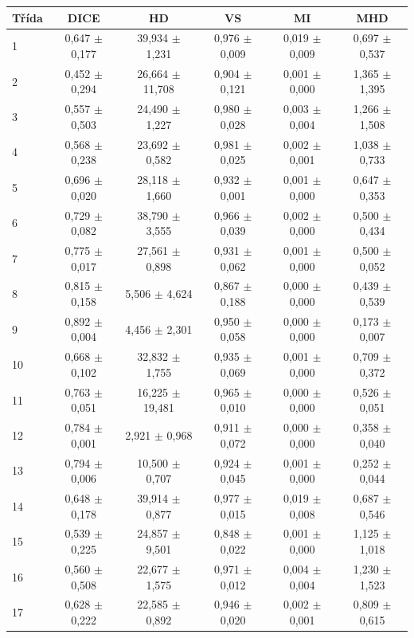 \begin{tabular}{l c c c c c}
 \hline
Třída & DICE & HD & VS & MI & MHD \\ \hline
1 & 0,647 $\pm$ 0,177 & 39,934 $\pm$ 1,231 & 0,976 $\pm$ 0,009 & 0,019 $\pm$ 0,009 & 0,697 $\pm$ 0,537 \\
2 & 0,452 $\pm$ 0,294 & 26,664 $\pm$ 11,708 & 0,904 $\pm$ 0,121 & 0,001 $\pm$ 0,000 & 1,365 $\pm$ 1,395 \\
3 & 0,557 $\pm$ 0,503 & 24,490 $\pm$ 1,227 & 0,980 $\pm$ 0,028 & 0,003 $\pm$ 0,004 & 1,266 $\pm$ 1,508 \\
4 & 0,568 $\pm$ 0,238 & 23,692 $\pm$ 0,582 & 0,981 $\pm$ 0,025 & 0,002 $\pm$ 0,001 & 1,038 $\pm$ 0,733 \\
5 & 0,696 $\pm$ 0,020 & 28,118 $\pm$ 1,660 & 0,932 $\pm$ 0,001 & 0,001 $\pm$ 0,000 & 0,647 $\pm$ 0,353 \\
6 & 0,729 $\pm$ 0,082 & 38,790 $\pm$ 3,555 & 0,966 $\pm$ 0,039 & 0,002 $\pm$ 0,000 & 0,500 $\pm$ 0,434 \\
7 & 0,775 $\pm$ 0,017 & 27,561 $\pm$ 0,898 & 0,931 $\pm$ 0,062 & 0,001 $\pm$ 0,000 & 0,500 $\pm$ 0,052 \\
8 & 0,815 $\pm$ 0,158 & 5,506 $\pm$ 4,624 & 0,867 $\pm$ 0,188 & 0,000 $\pm$ 0,000 & 0,439 $\pm$ 0,539 \\
9 & 0,892 $\pm$ 0,004 & 4,456 $\pm$ 2,301 & 0,950 $\pm$ 0,058 & 0,000 $\pm$ 0,000 & 0,173 $\pm$ 0,007 \\
10 & 0,668 $\pm$ 0,102 & 32,832 $\pm$ 1,755 & 0,935 $\pm$ 0,069 & 0,001 $\pm$ 0,000 & 0,709 $\pm$ 0,372 \\
11 & 0,763 $\pm$ 0,051 & 16,225 $\pm$ 19,481 & 0,965 $\pm$ 0,010 & 0,000 $\pm$ 0,000 & 0,526 $\pm$ 0,051 \\
12 & 0,784 $\pm$ 0,001 & 2,921 $\pm$ 0,968 & 0,911 $\pm$ 0,072 & 0,000 $\pm$ 0,000 & 0,358 $\pm$ 0,040 \\
13 & 0,794 $\pm$ 0,006 & 10,500 $\pm$ 0,707 & 0,924 $\pm$ 0,045 & 0,001 $\pm$ 0,000 & 0,252 $\pm$ 0,044 \\
14 & 0,648 $\pm$ 0,178 & 39,914 $\pm$ 0,877 & 0,977 $\pm$ 0,015 & 0,019 $\pm$ 0,008 & 0,687 $\pm$ 0,546 \\
15 & 0,539 $\pm$ 0,225 & 24,857 $\pm$ 9,501 & 0,848 $\pm$ 0,022 & 0,001 $\pm$ 0,000 & 1,125 $\pm$ 1,018 \\
16 & 0,560 $\pm$ 0,508 & 22,677 $\pm$ 1,575 & 0,971 $\pm$ 0,012 & 0,004 $\pm$ 0,004 & 1,230 $\pm$ 1,523 \\
17 & 0,628 $\pm$ 0,222 & 22,585 $\pm$ 0,892 & 0,946 $\pm$ 0,020 & 0,002 $\pm$ 0,001 & 0,809 $\pm$ 0,615 \\

\end{tabular}
